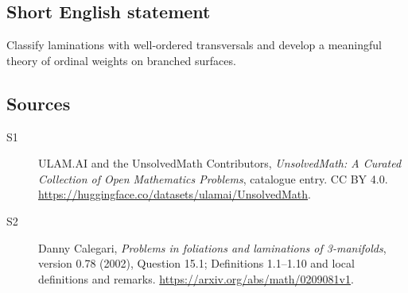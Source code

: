 \documentclass[11pt]{article}
\begin{document}
\subsection{Short English statement}
Classify laminations with well-ordered transversals and develop a meaningful theory of ordinal weights on branched surfaces.
\subsection{Sources}
\begin{description}
\item[\hypertarget{source:statement:1}{S1}] ULAM.AI and the UnsolvedMath Contributors, \emph{UnsolvedMath: A Curated Collection of Open Mathematics Problems}, catalogue entry. CC BY 4.0. \url{https://huggingface.co/datasets/ulamai/UnsolvedMath}.
\item[\hypertarget{source:statement:2}{S2}] Danny Calegari, \emph{Problems in foliations and laminations of 3-manifolds}, version 0.78 (2002), Question 15.1; Definitions 1.1--1.10 and local definitions and remarks. \url{https://arxiv.org/abs/math/0209081v1}.
\end{description}
\label{end:statement}
\end{document}
